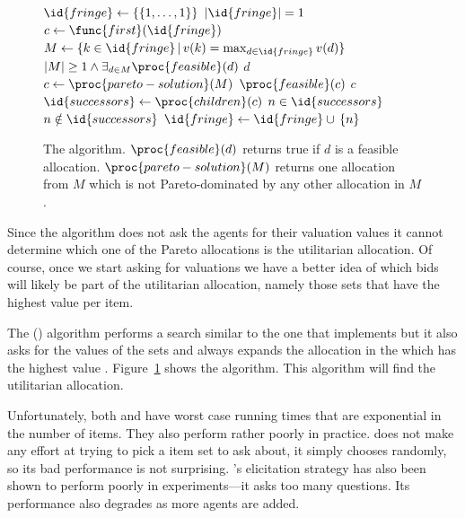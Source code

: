 \begin{figure}
  \begin{minipage}{1.0\linewidth}
    \begin{codebox}
      \li $\id{fringe} \gets \{\{1,\ldots,1\}\}$
      \li \If $|\id{fringe}| = 1$
      \li \Then $c \gets \func{first}(\id{fringe})$
      \li \Else $M \gets \{k \in \id{fringe} \,|\, v(k) = \max_{d \in
        \id{fringe}} v(d)\}$
      \li       \If $|M| \geq 1 \wedge \exists_{d \in M}
      \proc{feasible}(d)$
      \li       \Then \Return $d$
      \li       \Else $c \gets \proc{pareto-solution}(M)$
                \End
          \End
      \li \If $\proc{feasible}(c)$
      \li \Then \Return $c$
          \End
      \li $\id{successors} \gets \proc{children}(c)$
      \li \For $n \in \id{successors}$
      \li \Do \If $n \notin \id{successors}$
      \li     \Then $\id{fringe} \gets \id{fringe} \cup\, \{n\}$
              \End
          \End
      \li {}
    \end{codebox}
  \end{minipage}
      \caption{The  algorithm. $\proc{feasible}(d)$ returns
        true if $d$ is a feasible allocation.
        $\proc{pareto-solution}(M)$ returns one allocation from $M$
        which is not Pareto-dominated by any other allocation in $M$.}
      \label{fig:bfs-ca}
\end{figure}


Since the  algorithm does not ask the agents for their
valuation values it cannot determine which one of the Pareto
allocations is the utilitarian allocation. Of course, once we start
asking for valuations we have a better idea of which bids will likely
be part of the utilitarian allocation, namely those sets that have the
highest value per item.

The  () algorithm performs a search
similar to the one that  implements but it also asks for the
values of the sets and always expands the allocation in the
 which has the highest value \cite{conen02a}.
Figure~\ref{fig:bfs-ca} shows the algorithm. This algorithm will find
the utilitarian allocation.

Unfortunately, both  and  have worst case running
times that are exponential in the number of items. They also perform
rather poorly in practice.  does not make any effort at
trying to pick a item set to ask about, it simply chooses randomly, so
its bad performance is not surprising. 's elicitation
strategy has also been shown to perform poorly in experiments---it
asks too many questions. Its performance also degrades as more agents
are added.

